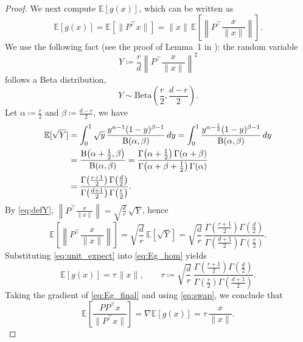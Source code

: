 \documentclass[10pt]{article}
\begin{document}
\begin{proof}
We next compute $\mathbb{E}[g(x)]$, which can be written as
\begin{equation}\label{eq:Eg_hom}
\mathbb{E}[g(x)]
=\mathbb{E}[\|P^\top x\|]
=\|x\|\,
\mathbb{E}\!\left[\left\|P^\top \frac{x}{\|x\|}\right\|\right].
\end{equation}
We use the following fact (see the proof of Lemma~1 in \cite{kozak2021}): the random variable
\begin{equation}\label{eq:defY}
Y \coloneqq \frac{r}{d}\left\|P^\top \frac{x}{\|x\|}\right\|^2
\end{equation}
follows a Beta distribution,
\begin{equation}\label{eq:Ybeta}
Y\sim \mathrm{Beta}\!\left(\frac{r}{2},\frac{d-r}{2}\right).
\end{equation}
Let $\alpha\coloneqq \frac{r}{2}$ and $\beta\coloneqq \frac{d-r}{2}$,
we have
\begin{align}
\mathbb{E}[\sqrt{Y}]
&=\int_0^1 \sqrt{y}\,
\frac{y^{\alpha-1}(1-y)^{\beta-1}}{\mathrm{B}(\alpha,\beta)}\,dy
=\int_0^1
\frac{y^{\alpha-\frac12}(1-y)^{\beta-1}}{\mathrm{B}(\alpha,\beta)}\,dy
\notag\\
&=\frac{\mathrm{B}\!\left(\alpha+\frac12,\beta\right)}{\mathrm{B}(\alpha,\beta)}
=\frac{\Gamma\!\left(\alpha+\frac12\right)\Gamma(\alpha+\beta)}
{\Gamma\!\left(\alpha+\beta+\frac12\right)\Gamma(\alpha)}
\notag\\
&=\frac{\Gamma\!\left(\frac{r+1}{2}\right)\Gamma\!\left(\frac{d}{2}\right)}
{\Gamma\!\left(\frac{d+1}{2}\right)\Gamma\!\left(\frac{r}{2}\right)}.
\label{eq:EsqrtY}
\end{align}
By \eqref{eq:defY}, $\left\|P^\top \frac{x}{\|x\|}\right\|=\sqrt{\frac{d}{r}}\,\sqrt{Y}$, hence
\begin{equation}\label{eq:unit_expect}
\mathbb{E}\!\left[\left\|P^\top \frac{x}{\|x\|}\right\|\right]
=
\sqrt{\frac{d}{r}}\,\mathbb{E}[\sqrt{Y}]
=
\sqrt{\frac{d}{r}}\,
\frac{\Gamma\!\left(\frac{r+1}{2}\right)\Gamma\!\left(\frac{d}{2}\right)}
{\Gamma\!\left(\frac{d+1}{2}\right)\Gamma\!\left(\frac{r}{2}\right)}.
\end{equation}
Substituting \eqref{eq:unit_expect} into \eqref{eq:Eg_hom} yields
\begin{equation}\label{eq:Eg_final}
\mathbb{E}[g(x)]
=
\tau\,\|x\|,
\qquad
\tau\coloneqq
\sqrt{\frac{d}{r}}\,
\frac{\Gamma\!\left(\frac{r+1}{2}\right)\Gamma\!\left(\frac{d}{2}\right)}
{\Gamma\!\left(\frac{r}{2}\right)\Gamma\!\left(\frac{d+1}{2}\right)}.
\end{equation}
Taking the gradient of \eqref{eq:Eg_final} and using \eqref{eq:swap}, we conclude that
\[
\mathbb{E}\!\left[\frac{PP^\top x}{\|P^\top x\|}\right]
=\nabla \mathbb{E}[g(x)]
=\tau\,\frac{x}{\|x\|}.
\]


\end{proof}
\end{document}
